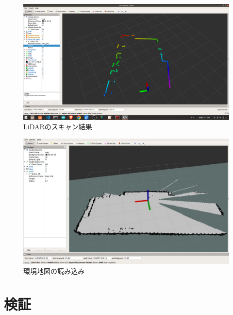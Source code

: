 \begin{figure}[h]
  \begin{center}
  \includegraphics[width=.8\linewidth]{img/slam_29.png}
  \caption{LiDARのスキャン結果}
  \label{slam:map:read}
  \end{center}
\end{figure}

\begin{figure}[h]
  \begin{center}
  \includegraphics[width=.6\linewidth]{img/slam_30.jpg}
  \caption{環境地図の読み込み}
  \label{slam:map}
  \end{center}
\end{figure}

\section{検証}

